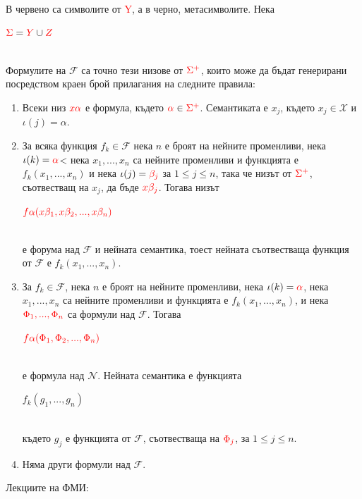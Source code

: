 \documentclass[11pt]{article} %
\newcommand{\redText}[1]{\textcolor{red}{#1}}
\newcommand{\enumNum}{\renewcommand{\theenumi}{\arabic{enumi}}}
\begin{document}
В червено са символите от \redText{Y}, а в черно, метасимволите. Нека \\
\centerline{$\redText{\Sigma} = \redText{Y} \cup \redText{Z}$}\\

Формулите на $\mathcal{F}$ са точно тези низове от $\redText{\Sigma^{+}}$, които може да бъдат генерирани посредством краен брой прилагания на следните правила:

\enumNum
\begin{enumerate}
	\item Всеки низ $\redText{x \alpha}$ е формула, където $\redText{\alpha} \in \redText{\Sigma^{+}}$. Семантиката е $x_{j}$, където $x_{j} \in \mathcal{X}$ и $\iota(j) = \alpha$. \\
	\item За всяка функция $f_{k} \in \mathcal{F}$ нека $n$ е броят на нейните променливи, нека $\iota(k) = \redText{\alpha}$< нека $x_{1}, ..., x_{n}$ са нейните променливи и функцията е $f_{k}(x_{1}, ..., x_{n})$ и нека $\iota(j) = \redText{\beta_{j}}$ за $1 \leq j \leq n$, така че низът от $\redText{\Sigma^{+}}$, съотвестващ на $x_{j}$, да бъде $\redText{x\beta_{j}}$. Тогава низът \\
		\centerline{$\redText{f\alpha(x\beta_{1}, x\beta_{2}, ..., x\beta_{n})}$} \\
	е форума над $\mathcal{F}$ и нейната семантика, тоест нейната съотвестваща функция от $\mathcal{F}$ е $f_{k}(x_{1}, ..., x_{n})$.\\
	\item За $f_{k} \in \mathcal{F}$, нека $n$ е броят на нейните променливи, нека $\iota(k) = \redText{\alpha}$, нека $x_{1}, ..., x_{n}$ са нейните променливи и функцията е $f_{k}(x_{1}, ..., x_{n})$, и нека $\redText{\Phi_{1}, ..., \Phi_{n}}$ са формули над $\mathcal{F}$. Тогава \\
		\centerline{$\redText{f\alpha(\Phi_{1},\Phi_{2},..., \Phi_{n})}$}\\
	е формула над $\mathcal{N}$. Нейната семантика е функцията \\
	\centerline{$f_{k}(g_{1}, ..., g_{n})$} \\
	където $g_{j}$ е функцията от $\mathcal{F}$, съотвестваща на $\redText{\Phi_{j}}$, за $1 \leq j \leq n$.
	\item Няма други формули над $\mathcal{F}$.
\end{enumerate}

\begin{thebibliography}{1}
Лекциите на ФМИ: 
\end{thebibliography}
\end{document}
